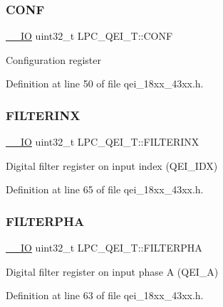 \subsubsection{\texorpdfstring{C\+O\+NF}{CONF}}
{\footnotesize\ttfamily \hyperlink{core__sc300_8h_aec43007d9998a0a0e01faede4133d6be}{\+\_\+\+\_\+\+IO} uint32\+\_\+t L\+P\+C\+\_\+\+Q\+E\+I\+\_\+\+T\+::\+C\+O\+NF}

Configuration register 

Definition at line 50 of file qei\+\_\+18xx\+\_\+43xx.\+h.

\mbox{\label{struct_l_p_c___q_e_i___t_a92cbc5ae36dcd7194b4b1f3d448ca2e5}} 
\subsubsection{\texorpdfstring{F\+I\+L\+T\+E\+R\+I\+NX}{FILTERINX}}
{\footnotesize\ttfamily \hyperlink{core__sc300_8h_aec43007d9998a0a0e01faede4133d6be}{\+\_\+\+\_\+\+IO} uint32\+\_\+t L\+P\+C\+\_\+\+Q\+E\+I\+\_\+\+T\+::\+F\+I\+L\+T\+E\+R\+I\+NX}

Digital filter register on input index (Q\+E\+I\+\_\+\+I\+DX) 

Definition at line 65 of file qei\+\_\+18xx\+\_\+43xx.\+h.

\mbox{\label{struct_l_p_c___q_e_i___t_ae8de561fff333fbf117036c7de063c36}} 
\subsubsection{\texorpdfstring{F\+I\+L\+T\+E\+R\+P\+HA}{FILTERPHA}}
{\footnotesize\ttfamily \hyperlink{core__sc300_8h_aec43007d9998a0a0e01faede4133d6be}{\+\_\+\+\_\+\+IO} uint32\+\_\+t L\+P\+C\+\_\+\+Q\+E\+I\+\_\+\+T\+::\+F\+I\+L\+T\+E\+R\+P\+HA}

Digital filter register on input phase A (Q\+E\+I\+\_\+A) 

Definition at line 63 of file qei\+\_\+18xx\+\_\+43xx.\+h.


